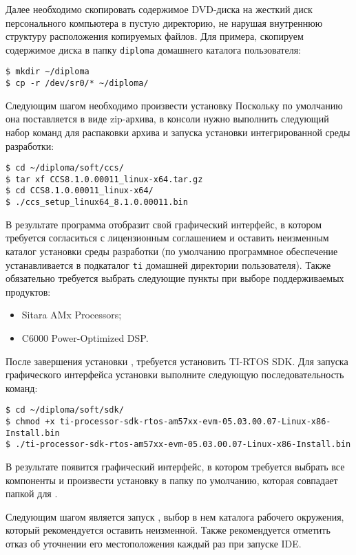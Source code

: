 Далее необходимо скопировать содержимое DVD-диска на жесткий диск
персонального компьютера в пустую директорию, не нарушая внутреннюю структуру
расположения копируемых файлов. Для примера, скопируем содержимое диска в папку
\lstinline{diploma} домашнего каталога пользователя:
\begin{lstlisting}
$ mkdir ~/diploma
$ cp -r /dev/sr0/* ~/diploma/
\end{lstlisting}

Следующим шагом необходимо произвести установку Поскольку
по умолчанию она поставляется в виде zip-архива, в консоли нужно выполнить
следующий набор команд для распаковки архива и запуска установки интегрированной
среды разработки:
\begin{lstlisting}
$ cd ~/diploma/soft/ccs/
$ tar xf CCS8.1.0.00011_linux-x64.tar.gz
$ cd CCS8.1.0.00011_linux-x64/
$ ./ccs_setup_linux64_8.1.0.00011.bin
\end{lstlisting}

В результате программа отобразит свой графический интерфейс, в котором требуется
согласиться с лицензионным соглашением и оставить неизменным каталог установки
среды разработки (по умолчанию программное обеспечение устанавливается в
подкаталог \lstinline{ti} домашней директории пользователя). Также обязательно требуется
выбрать следующие пункты при выборе поддерживаемых продуктов:
\begin{itemize}
    \item Sitara\texttrademark{} AMx Processors;
    \item C6000 Power-Optimized DSP.
\end{itemize}

После завершения установки , требуется установить TI-RTOS SDK.
Для запуска графического интерфейса установки выполните следующую последовательность
команд:
\begin{lstlisting}
$ cd ~/diploma/soft/sdk/
$ chmod +x ti-processor-sdk-rtos-am57xx-evm-05.03.00.07-Linux-x86-Install.bin
$ ./ti-processor-sdk-rtos-am57xx-evm-05.03.00.07-Linux-x86-Install.bin
\end{lstlisting}

В результате появится графический интерфейс, в котором требуется выбрать все
компоненты и произвести установку в папку по умолчанию, которая совпадает
папкой для .

Следующим шагом является запуск , выбор в нем каталога рабочего окружения,
который рекомендуется оставить неизменной. Также рекомендуется отметить отказ
об уточнении его местоположения каждый раз при запуске IDE.

